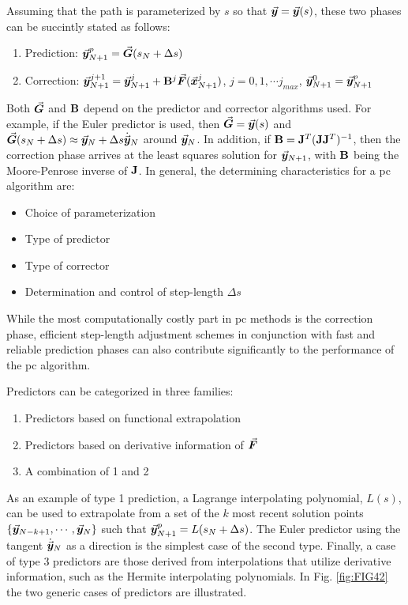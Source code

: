 Assuming that the path is parameterized by $s$ so that
$\vec{\bm{y}}=\vec{\bm{y}}(s)$, these two phases can be succintly stated as follows:
\begin{enumerate}[noitemsep]
	\item Prediction: $\vec{\bm{y}}^p_{N+1}=\vec{\bm{G}}(s_N+\Delta s)$
	\item Correction: $\vec{\bm{y}}^{j+1}_{N+1} = 
	\vec{\bm{y}}^j_{N+1}+\mathbf{B}^j\vec{\bm{F}}(\vec{\bm{x}}^j_{N+1})$, $j=0,1,\cdots
	j_{max}$, $\vec{\bm{y}}^0_{N+1}=\vec{\bm{y}}^p_{N+1}$
\end{enumerate}
Both $\vec{\bm{G}}$ and $\mathbf{B}$ depend on the predictor and corrector algorithms 
used. For
example, if the Euler predictor is used, then $\vec{\bm{G}}=\vec{\bm{y}}(s)$ and 
$\vec{\bm{G}}(s_N+\Delta
s)\approx \vec{\bm{y}}_N+\Delta s \dot{\vec{\bm{y}}}_N$ around $\vec{\bm{y}}_N$. In 
addition, if $\mathbf{B} = \mathbf{J}^T(\mathbf{J}\mathbf{J}^T)^{-1}$, then the
correction phase arrives at the least squares solution for $\vec{\bm{y}}_{N+1}$, 
with $\mathbf{B}$ being the Moore-Penrose inverse of $\mathbf{J}$. 
In general, the determining characteristics for a \acrshort{pc} algorithm are:
\begin{itemize}[noitemsep]
	\item Choice of parameterization 
	\item Type of predictor
	\item Type of corrector
	\item Determination and control of step-length $\Delta s$
\end{itemize}
While the most computationally costly part in \acrshort{pc} methods is the 
correction phase, efficient step-length adjustment schemes in conjunction with 
fast and reliable prediction phases can also
contribute significantly to the performance of the \acrshort{pc} algorithm.

Predictors can be categorized in three families:
\begin{enumerate}[noitemsep]
	\item Predictors based on functional extrapolation
	\item Predictors based on derivative information of $\vec{\bm{F}}$
	\item A combination of 1 and 2
\end{enumerate}
As an example of type 1 prediction, a Lagrange interpolating polynomial, $L(s)$,
can be used to extrapolate from a set of the $k$ most recent solution points 
$\{\vec{\bm{y}}_{N-k+1},\cdots,\vec{\bm{y}}_N\}$ such that 
$\vec{\bm{y}}^p_{N+1}=L(s_N+\Delta
s)$\cite{Rheinboldt75,Deuflhard87}. The
Euler predictor using the tangent $\dot{\vec{\bm{y}}}_N$ as a direction is the 
simplest
case of the second type. Finally, a case of type 3 predictors are those derived 
from interpolations that utilize derivative information, such as the Hermite 
interpolating polynomials. In Fig. \ref{fig:FIG42} the two generic cases of 
predictors are illustrated.

